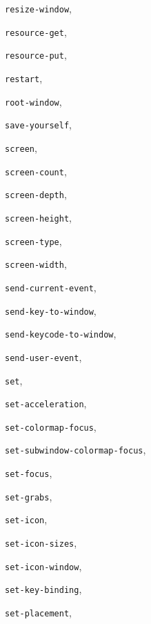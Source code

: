 \begin{theindex}
\item {\tt resize-window}, {\bf\pageref{resize-window}}
\item {\tt resource-get}, {\bf\pageref{resource-get}}
\item {\tt resource-put}, {\bf\pageref{resource-put}}
\item {\tt restart}, {\bf\pageref{restart}}
\item {\tt root-window}, {\bf\pageref{root-window}}
\item {\tt save-yourself}, {\bf\pageref{save-yourself}}
\item {\tt screen}, {\bf\pageref{screen}}
\item {\tt screen-count}, {\bf\pageref{screen-count}}
\item {\tt screen-depth}, {\bf\pageref{screen-depth}}
\item {\tt screen-height}, {\bf\pageref{screen-height}}
\item {\tt screen-type}, {\bf\pageref{screen-type}}
\item {\tt screen-width}, {\bf\pageref{screen-width}}
\item {\tt send-current-event}, {\bf\pageref{send-current-event}}
\item {\tt send-key-to-window}, {\bf\pageref{send-key-to-window}}
\item {\tt send-keycode-to-window}, {\bf\pageref{send-keycode-to-window}}
\item {\tt send-user-event}, {\bf\pageref{send-user-event}}
\item {\tt set}, {\bf\pageref{set}}
\item {\tt set-acceleration}, {\bf\pageref{set-acceleration}}
\item {\tt set-colormap-focus}, {\bf\pageref{set-colormap-focus}}
\item {\tt set-subwindow-colormap-focus}, {\bf\pageref{set-subwindow-colormap-focus}}
\item {\tt set-focus}, {\bf\pageref{set-focus}}
\item {\tt set-grabs}, {\bf\pageref{set-grabs}}
\item {\tt set-icon}, {\bf\pageref{set-icon}}
\item {\tt set-icon-sizes}, {\bf\pageref{set-icon-sizes}}
\item {\tt set-icon-window}, {\bf\pageref{set-icon-window}}
\item {\tt set-key-binding}, {\bf\pageref{set-key-binding}}
\item {\tt set-placement}, {\bf\pageref{set-placement}}

\end{theindex}
